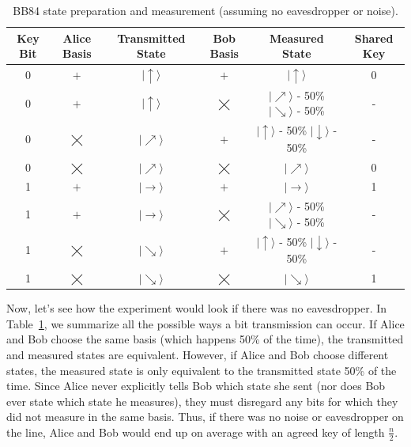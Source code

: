 \documentclass[11pt]{article} %
\begin{document}
\begin{table}[h!]
    \centering
    \begin{tabular}{c|cc|cc|c}
         Key Bit & Alice Basis & Transmitted State & Bob Basis & Measured State & Shared Key \\
         \hline
         0 & $\pmb{+}$ & $|\uparrow\rangle$ & $\pmb{+}$ & $|\uparrow\rangle$ & 0 \\
         \hline
         0 & $\pmb{+}$ & $|\uparrow\rangle$ & $\bigtimes$ & \makecell{$|\nearrow\rangle$ - 50\% \\ $|\searrow\rangle$ - 50\%} & - \\
         \hline
         0 & $\bigtimes$ & $|\nearrow\rangle$ & $\pmb{+}$ & \makecell{$|\uparrow\rangle$ - 50\% \\ $|\downarrow\rangle$ - 50\%} & - \\
         \hline
         0 & $\bigtimes$ & $|\nearrow\rangle$ & $\bigtimes$ & $|\nearrow\rangle$ & 0 \\
         \hline
         1 & $\pmb{+}$ & $|\rightarrow\rangle$ & $\pmb{+}$ & $|\rightarrow\rangle$ & 1 \\
         \hline
         1 & $\pmb{+}$ & $|\rightarrow\rangle$ & $\bigtimes$ & \makecell{$|\nearrow\rangle$ - 50\% \\ $|\searrow\rangle$ - 50\%} & - \\
         \hline
         1 & $\bigtimes$ & $|\searrow\rangle$ & $\pmb{+}$ & \makecell{$|\uparrow\rangle$ - 50\% \\ $|\downarrow\rangle$ - 50\%} & - \\
         \hline
         1 & $\bigtimes$ & $|\searrow\rangle$ & $\bigtimes$ & $|\searrow\rangle$ & 1 \\
    \end{tabular}
    \caption{BB84 state preparation and measurement (assuming no eavesdropper or noise).}
    \label{tab:qkd}
\end{table}

Now, let's see how the experiment would look if there was no eavesdropper. In Table~\ref{tab:qkd}, we summarize all the possible ways a bit transmission can occur. If Alice and Bob choose the same basis (which happens 50\% of the time), the transmitted and measured states are equivalent. However, if Alice and Bob choose different states, the measured state is only equivalent to the transmitted state 50\% of the time. Since Alice never explicitly tells Bob which state she sent (nor does Bob ever state which state he measures), they must disregard any bits for which they did not measure in the same basis. Thus, if there was no noise or eavesdropper on the line, Alice and Bob would end up on average with an agreed key of length $\frac{n}{2}$.
\end{document}
